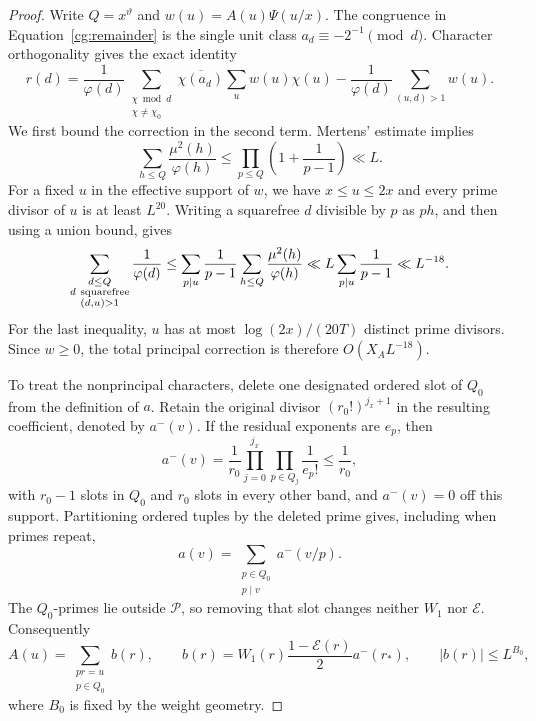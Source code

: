 \begin{proof}
Write $Q=x^\vartheta$ and $w(u)=A(u)\Psi(u/x)$. The congruence in
Equation~\eqref{cg:remainder} is the single unit class
$a_d\equiv-2^{-1}\pmod d$. Character orthogonality gives the exact
identity
\begin{equation}\label{cg:characters}
 r(d)=\frac1{\varphi(d)}
       \sum_{\substack{\chi\bmod d\\\chi\ne\chi_0}}
          \overline{\chi(a_d)}\sum_u w(u)\chi(u)
       -\frac1{\varphi(d)}\sum_{(u,d)>1}w(u).
\end{equation}
We first bound the correction in the second term. Mertens' estimate
implies
\begin{equation}\label{cg:totient-sum}
 \sum_{h\le Q}\frac{\mu^2(h)}{\varphi(h)}
 \le\prod_{p\le Q}\left(1+\frac1{p-1}\right)\ll L.
\end{equation}
For a fixed $u$ in the effective support of $w$, we have
$x\le u\le2x$ and every prime divisor of $u$ is at least $L^{20}$.
Writing a squarefree $d$ divisible by $p$ as $ph$, and then using a
union bound, gives
\[
 \sum_{\substack{d\le Q\\d\ {\rm squarefree}\\(d,u)>1}}
       \frac1{\varphi(d)}
 \le\sum_{p\mid u}\frac1{p-1}
        \sum_{h\le Q}\frac{\mu^2(h)}{\varphi(h)}
 \ll L\sum_{p\mid u}\frac1{p-1}\ll L^{-18}.
\]
For the last inequality, $u$ has at most
$\log(2x)/(20T)$ distinct prime divisors. Since $w\ge0$, the total
principal correction is therefore $O(X_A L^{-18})$.

To treat the nonprincipal characters, delete one designated ordered
slot of $Q_0$ from the definition of $a$. Retain the original divisor
$(r_0!)^{j_x+1}$ in the resulting coefficient, denoted by $a^-(v)$.
If the residual exponents are $e_p$, then
\[
 a^-(v)=\frac1{r_0}\prod_{j=0}^{j_x}\prod_{p\in Q_j}\frac1{e_p!}
 \le\frac1{r_0},
\]
with $r_0-1$ slots in $Q_0$ and $r_0$ slots in every other band, and
$a^-(v)=0$ off this support. Partitioning ordered tuples by the
deleted prime gives, including when primes repeat,
\[
 a(v)=\sum_{\substack{p\in Q_0\\p\mid v}}a^-(v/p).
\]
The $Q_0$-primes lie outside $\mathcal P$, so removing that slot
changes neither $W_1$ nor $\mathcal E$. Consequently
\begin{equation}\label{cg:prime-convolution}
 A(u)=\sum_{\substack{pr=u\\p\in Q_0}}b(r),
 \qquad
 b(r)=W_1(r)\frac{1-\mathcal E(r)}2a^-(r_*),
 \qquad |b(r)|\le L^{B_0},
\end{equation}
where $B_0$ is fixed by the weight geometry.


\end{proof}
